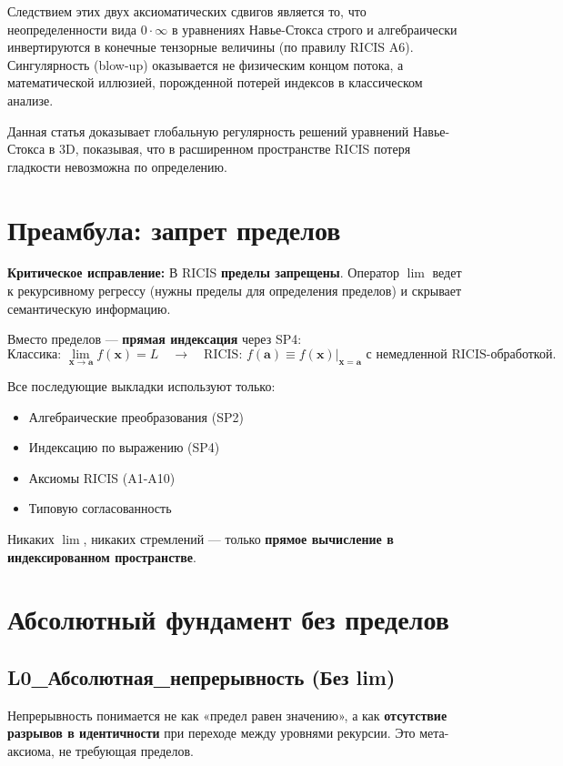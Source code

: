 \documentclass[12pt]{article}
\newcommand{\0}{\mathbf{0}}
\newcommand{\1}{\mathds{1}}
\newcommand{\bx}{\mathbf{x}}
\begin{document}
Следствием этих двух аксиоматических сдвигов является то, что неопределенности вида $0 \cdot \infty$ в уравнениях Навье-Стокса строго и алгебраически инвертируются в конечные тензорные величины (по правилу RICIS A6). Сингулярность (blow-up) оказывается не физическим концом потока, а математической иллюзией, порожденной потерей индексов в классическом анализе. 

Данная статья доказывает глобальную регулярность решений уравнений Навье-Стокса в 3D, показывая, что в расширенном пространстве RICIS потеря гладкости невозможна по определению.

\section{Преамбула: запрет пределов}

\textbf{Критическое исправление:} В RICIS \textbf{пределы запрещены}. Оператор $\lim$ ведет к рекурсивному регрессу (нужны пределы для определения пределов) и скрывает семантическую информацию.

Вместо пределов --- \textbf{прямая индексация} через SP4:
\[
\text{Классика: } \lim_{\bx\to \mathbf{a}} f(\bx) = L \quad \longrightarrow \quad \text{RICIS: } f(\mathbf{a}) \equiv f(\bx)\big|_{\bx=\mathbf{a}} \text{ с немедленной RICIS-обработкой}.
\]

Все последующие выкладки используют только:
\begin{itemize}
    \item Алгебраические преобразования (SP2)
    \item Индексацию по выражению (SP4)
    \item Аксиомы RICIS (A1-A10)
    \item Типовую согласованность
\end{itemize}
Никаких $\lim$, никаких стремлений --- только \textbf{прямое вычисление в индексированном пространстве}.

\section{Абсолютный фундамент без пределов}

\subsection{L0\_Абсолютная\_непрерывность (Без lim)}
Непрерывность понимается не как «предел равен значению», а как \textbf{отсутствие разрывов в идентичности} при переходе между уровнями рекурсии. Это мета-аксиома, не требующая пределов.
\end{document}
